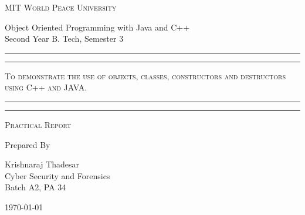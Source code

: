 \documentclass[11pt]{article}
\begin{document}
	
	\begin{titlepage} 
		\centering 
		
		
		\huge\textsc{
			MIT World Peace University
		}\\
	
		\vspace{0.75\baselineskip} %
		
		\LARGE{
			Object Oriented Programming with Java and C++\\
			Second Year B. Tech, Semester 3
		}
		
		\vfill %
		
		
		\rule{\textwidth}{1.6pt}\vspace*{-\baselineskip}\vspace*{2pt}
		\rule{\textwidth}{0.6pt}
		\vspace{0.75\baselineskip} %
		
		
		
		\huge{\textsc{
			To demonstrate the use of objects, classes, constructors and destructors using C++ and JAVA.
			}} \\
		
		
		
		\vspace{0.5\baselineskip} %
		\rule{\textwidth}{0.6pt}\vspace*{-\baselineskip}\vspace*{2.8pt}
		\rule{\textwidth}{1.6pt}
		
		\vspace{1\baselineskip} %

			
		\LARGE\textsc{
			Practical Report
		} %
		\vfill
		
		
		Prepared By
		\vspace{0.5\baselineskip} %
		
		\Large{
			Krishnaraj Thadesar \\
			Cyber Security and Forensics\\
			Batch A2, PA 34
		}
		
		
		\vspace{0.5\baselineskip} %
		\today

	\end{titlepage}
	
\end{document}
